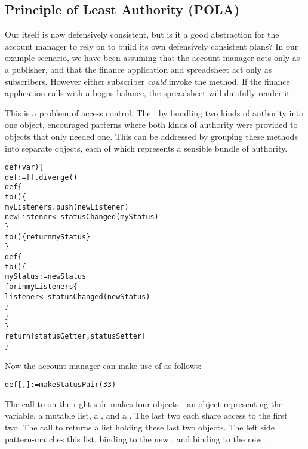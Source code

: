 \documentclass{llncs}
\begin{document}
\subsection{Principle of Least Authority (POLA)}

Our  itself is now defensively consistent, but is
it a good abstraction for the account manager to rely on to build its
own defensively consistent plans? In our example scenario, we have
been assuming that the account manager acts only as a publisher, and
that the finance application and spreadsheet act only as
subscribers. However either subscriber \emph{could} invoke the
 method. If the finance application calls
 with a bogus balance, the spreadsheet will dutifully
render it.

This is a problem of access control. The , by
bundling two kinds of authority into one object, encouraged patterns
where both kinds of authority were provided to objects that only
needed one. This can be addressed by grouping these methods into
separate objects, each of which represents a sensible bundle of
authority.
%
\begin{alltt}
    def (var ) \{
        def  := [].diverge()
        def  \{
            to () \{
                myListeners.push(newListener)
                newListener <- statusChanged(myStatus)
            \}
            to () \{ return myStatus \}
        \}
        def  \{
            to () \{
                myStatus := newStatus
                for  in myListeners \{
                    listener <- statusChanged(newStatus)
                \}
            \}
        \}
        return [statusGetter, statusSetter]
    \}
\end{alltt}
%
Now the account manager can make use of  as
follows:
%
\begin{alltt}
    def [, ] := makeStatusPair(33)
\end{alltt}
%
The call to  on the right side makes four
objects---an object representing the  variable, a
mutable  list, a , and a
. The last two each share access to the first
two. The call to  returns a list holding these
last two objects. The left side pattern-matches this list, binding
 to the new , and binding 
to the new .
\end{document}
